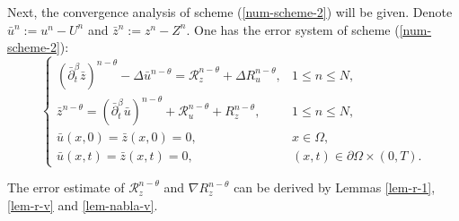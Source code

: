 \documentclass[11pt]{article}
\numberwithin{equation}{section}
\begin{document}
Next, the convergence analysis 
 of scheme (\ref{num-scheme-2}) will be given. Denote $\bar u^n:=u^n-U^n$ and $\bar z^n:=z^n-Z^n$. One has the error system of scheme (\ref{num-scheme-2}): 
\begin{equation}\label{error-system-2} 
\begin{cases}   (\bar\partial_t^\beta \bar z)^{n-\theta} - \Delta \bar u^{n-\theta} = \mathcal{R}_z^{n-\theta}+\Delta R_u^{n-\theta}, & 1\le n\le N, \\   
\bar z^{n-\theta}  = (\bar\partial_t^\beta \bar u)^{n-\theta} + \mathcal{R}_u^{n-\theta}+R_z^{n-\theta}, & 1\le n\le N, \\   
\bar u(x,0) = \bar z(x,0)=0, & x \in \Omega, \\   
\bar u(x,t) = \bar z(x,t)=0, & (x,t) \in \partial \Omega \times (0,T). \end{cases} 
\end{equation}

The error estimate of $\mathcal{R}_z^{n-\theta}$ and $\nabla R_z^{n-\theta}$ can be derived by Lemmas \ref{lem-r-1}, \ref{lem-r-v}  and \ref{lem-nabla-v}.
\end{document}
